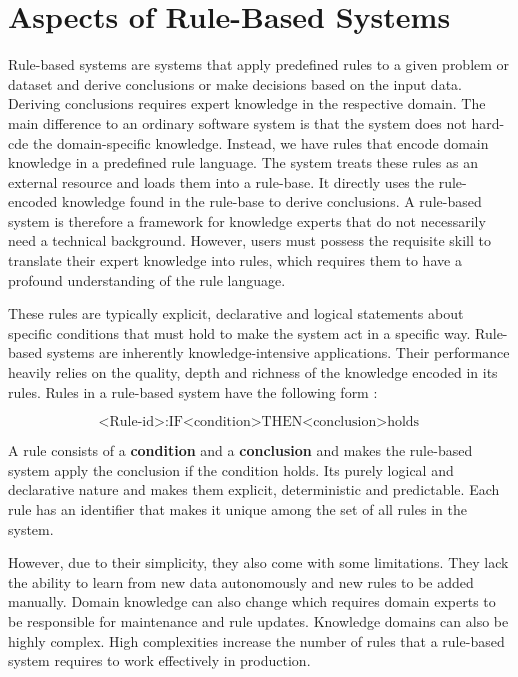 \chapter{Aspects of Rule-Based Systems}\label{ch:aspects-of-rule-based-systems}

Rule-based systems are systems that apply predefined rules to a given problem or dataset
and derive conclusions or make decisions based on the input data\cite{grosan2011rule}.
Deriving conclusions requires expert knowledge in the respective domain.
The main difference to an ordinary software system is that the system does not hard-cde the domain-specific knowledge.
Instead, we have rules that encode domain knowledge in a predefined rule language.
The system treats these rules as an external resource and loads them into a rule-base.
It directly uses the rule-encoded knowledge found in the rule-base to derive conclusions.
A rule-based system is therefore a framework for knowledge experts that do not necessarily need a technical background.
However, users must possess the requisite skill to translate their expert knowledge into rules,
which requires them to have a profound understanding of the rule language.

These rules are typically explicit,
declarative and logical statements about specific conditions that must hold to make the system act in a specific way.
Rule-based systems are inherently knowledge-intensive applications\cite{hayes1985rule}.
Their performance heavily relies on the quality,
depth and richness of the knowledge encoded in its rules.
Rules in a rule-based system have the following form \cite{hayes1985rule}:

\[
    \text{<Rule-id>}: \text{IF} \text{<condition>} \text{THEN} \text{<conclusion>} \text{holds}
\]


A rule consists of a \textbf{condition} and a \textbf{conclusion}
and makes the rule-based system apply the conclusion if the condition holds.
Its purely logical and declarative nature and makes them explicit, deterministic and predictable.
Each rule has an identifier that makes it unique among the set of all rules in the system.

However, due to their simplicity, they also come with some limitations.
They lack the ability to learn from new data autonomously and new rules to be added manually.
Domain knowledge can also change which requires domain experts to be responsible for maintenance and rule updates.
Knowledge domains can also be highly complex.
High complexities increase the number of rules that a rule-based system requires to work effectively in production.


